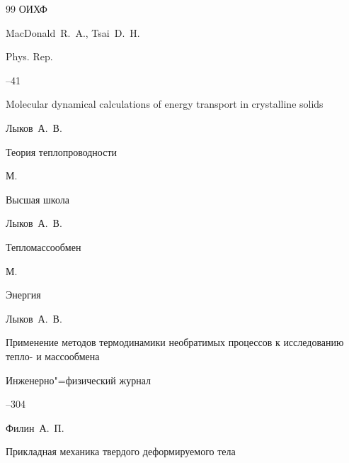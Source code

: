 \begin{thebibliography}{99}
\publ ОИХФ






\by MacDonald~R.~A., Tsai~D.~H.

\jour Phys. Rep.




--41

\paper Molecular dynamical calculations of energy transport in crystalline solids







\by Лыков~А.~В.

\book Теория теплопроводности

\publaddr М.

\publ Высшая школа






\by Лыков~А.~В.

\book Тепломассообмен

\publaddr М.

\publ Энергия






\by Лыков~А.~В.

\paper Применение методов термодинамики необратимых процессов к исследованию тепло- и массообмена

\jour Инженерно"=физический журнал




--304




\by Филин~А.~П.

\book Прикладная механика твердого деформируемого тела



\end{thebibliography}
